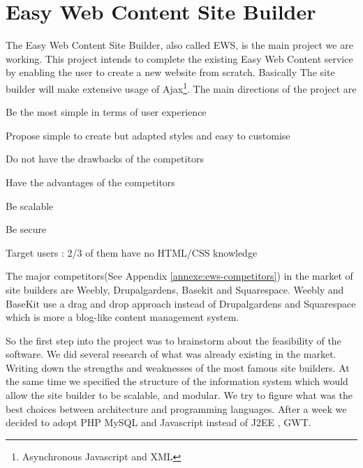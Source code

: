\chapter{Easy Web Content Site Builder}

The Easy Web Content Site Builder, also called EWS, is the main project we are working. This project intends to complete the existing Easy Web Content service by enabling the user to create a new website from scratch.
Basically The site builder will make extensive usage of Ajax\footnote{Asynchronous Javascript and XML}. The main directions of the project are
\begin{itemize*}
\item Be the most simple in terms of user experience
\item Propose simple to create but adapted styles and easy to customise
\item Do not have the drawbacks of the competitors
\item Have the advantages of the competitors
\item Be scalable
\item Be secure
\item Target users : 2/3 of them have no HTML/CSS knowledge
\end{itemize*}

The major competitors(See Appendix \ref{annexe:ews-competitors})  in the market of site builders are Weebly, Drupalgardens, Basekit and Squarespace.
Weebly and BaseKit use a drag and drop approach instead of Drupalgardens and Squarespace which is more a blog-like content management system.

So the first step into the project was to brainstorm about the feasibility of the software. We did several research of what was already existing in the market. Writing down the strengths and weaknesses of the most famous site builders. At the same time we specified the structure of the information system which would allow the site builder to be scalable, and modular. We try to figure what was the best choices between architecture and programming languages. After a week we decided to adopt PHP MySQL and Javascript instead of J2EE , GWT. 

